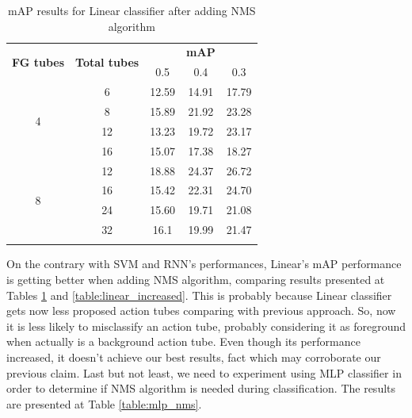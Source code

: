 \documentclass{report}
\begin{document}
\begin{center}
  \begin{longtable}{|| c | c || c c c ||}
    \hline
    \multirow{2}{*}{\textbf{FG tubes}} & \multirow{2}{*}{\textbf{Total tubes}} & {} & \textbf{mAP} & {} \\
    {} & {} & 0.5 & 0.4 & 0.3 \\
    \hline
    \multirow{4}{*}{4} & 6 & 12.59 & 14.91 & 17.79  \\
    \cline{2-5}
    {} & 8 & 15.89 & 21.92 & 23.28 \\
    \cline{2-5}
    {} & 12 & 13.23 & 19.72 & 23.17 \\
    \cline{2-5}
    {} & 16 & 15.07 & 17.38 & 18.27 \\
    \hline
    \multirow{4}{*}{8} & 12 & 18.88 & 24.37 & 26.72 \\
    \cline{2-5}
    {} & 16 & 15.42 & 22.31 & 24.70 \\
    \cline{2-5}
    {} & 24 & 15.60 & 19.71 & 21.08 \\
    \cline{2-5}
    {} & 32 & 16.1 & 19.99 & 21.47 \\
    \hline

  \caption{mAP results for Linear classifier after adding NMS algorithm}
  \label{table:linear_nms}
\end{longtable}
\end{center}

On the contrary with SVM and RNN's performances, Linear's mAP performance is getting better when adding NMS algorithm, comparing results presented at
Tables \ref{table:linear_nms} and  \ref{table:linear_increased}. This is probably because Linear classifier gets now less proposed action tubes comparing with
previous approach. So, now it is less likely to misclassify an action tube, probably considering it as foreground when actually is a background action tube.
Even though its performance increased, it doesn't achieve our best results, fact which may corroborate our previous claim.
Last but not least, we need to experiment using MLP classifier in order to determine if NMS algorithm is needed during classification. The results are presented at
Table \ref{table:mlp_nms}.
\end{document}
